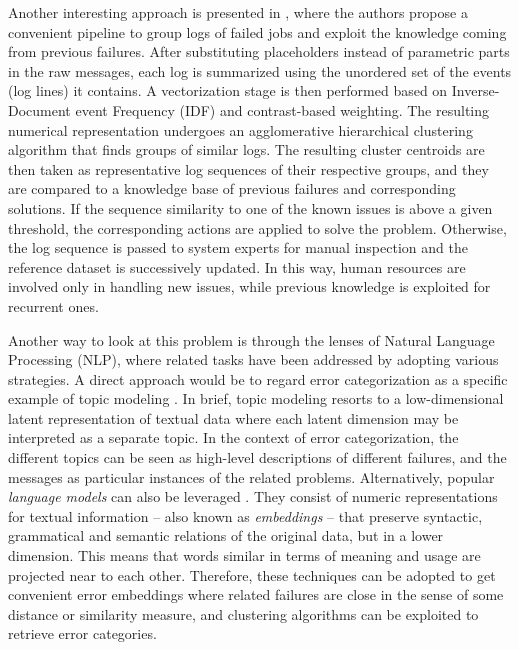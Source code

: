 Another interesting approach is presented in , where the authors propose a convenient pipeline to group logs of failed jobs and exploit the knowledge coming from previous failures.
After substituting placeholders instead of parametric parts in the raw messages, each log is summarized using the unordered set of the events (log lines) it contains.
A vectorization stage is then performed based on Inverse-Document event Frequency (IDF) and contrast-based weighting. 
The resulting numerical representation undergoes an agglomerative hierarchical clustering algorithm that finds groups of similar logs.
The resulting cluster centroids are then taken as representative log sequences of their respective groups, and they are compared to a knowledge base of previous failures and corresponding solutions. If the sequence similarity to one of the known issues is above a given threshold, the corresponding actions are applied to solve the problem. Otherwise, the log sequence is passed to system experts for manual inspection and the reference dataset is successively updated.
In this way, human resources are involved only in handling new issues, while previous knowledge is exploited for recurrent ones.

Another way to look at this problem is through the lenses of Natural Language Processing (NLP), where related tasks have been addressed by adopting various strategies.
A direct approach would be to regard error categorization as a specific example of topic modeling \cite{hofmann1999probabilistic, papadimitriou2000latent}.
In brief, topic modeling resorts to a low-dimensional latent representation of textual data where each latent dimension may be interpreted as a separate topic.
In the context of error categorization, the different topics can be seen as high-level descriptions of different failures, and the messages as particular instances of the related problems.
Alternatively, popular \textit{language models} can also be leveraged \cite{devlin2018bert, peters2018elmo, brown2020gpt3}.
They consist of numeric representations for textual information -- also known as \textit{embeddings} -- that preserve syntactic, grammatical and semantic relations of the original data, but in a lower dimension. 
This means that words similar in terms of meaning and usage are projected near to each other.
Therefore, these techniques can be adopted to get convenient error embeddings where related failures are close in the sense of some distance or similarity measure, and clustering algorithms can be exploited to retrieve error categories.

